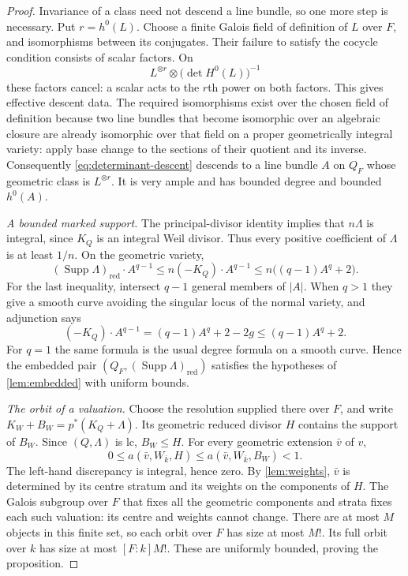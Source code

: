 \documentclass[11pt]{article}
\numberwithin{equation}{section}
\theoremstyle{definition}
\newcommand{\kb}{\overline{k}}
\newcommand{\Supp}{\operatorname{Supp}}
\newcommand{\red}{\mathrm{red}}
\begin{document}
\begin{proof}
Invariance of a class need not descend a line bundle, so one more step
is necessary. Put $r=h^0(L)$. Choose a finite Galois field of definition
of $L$ over $F$, and isomorphisms between its conjugates. Their failure
to satisfy the cocycle condition consists of scalar factors. On
\begin{equation}\label{eq:determinant-descent}
 L^{\otimes r}\otimes\bigl(\det H^0(L)\bigr)^{-1}
\end{equation}
these factors cancel: a scalar acts to the $r$th power on both factors.
This gives effective descent data. The required isomorphisms exist
over the chosen field of definition because two line bundles that
become isomorphic over an algebraic closure are already isomorphic
over that field on a proper geometrically integral variety: apply
base change to the sections of their quotient and its inverse.
Consequently \eqref{eq:determinant-descent} descends to a line bundle
$A$ on $Q_F$ whose geometric class is $L^{\otimes r}$. It is very ample
and has bounded degree and bounded $h^0(A)$.

\emph{A bounded marked support.}
The principal-divisor identity implies that $n\Lambda$ is integral,
since $K_Q$ is an integral Weil divisor. Thus every positive coefficient
of $\Lambda$ is at least $1/n$. On the geometric variety,
\begin{equation}\label{eq:marked-degree}
 (\Supp\Lambda)_{\red}\cdot A^{q-1}
 \leq n(-K_Q)\cdot A^{q-1}
 \leq n\bigl((q-1)A^q+2\bigr).
\end{equation}
For the last inequality, intersect $q-1$ general members of $|A|$.
When $q>1$ they give a smooth curve avoiding the singular locus of
the normal variety, and adjunction says
\[
 (-K_Q)\cdot A^{q-1}=(q-1)A^q+2-2g\leq(q-1)A^q+2.
\]
For $q=1$ the same formula is the usual degree formula on a smooth
curve. Hence the embedded pair $(Q_F,(\Supp\Lambda)_\red)$ satisfies
the hypotheses of \cref{lem:embedded} with uniform bounds.

\emph{The orbit of a valuation.}
Choose the resolution supplied there over $F$, and write
$K_W+B_W=p^*(K_Q+\Lambda)$. Its geometric reduced divisor $H$ contains
the support of $B_W$. Since $(Q,\Lambda)$ is lc, $B_W\leq H$.
For every geometric extension $\bar v$ of $v$,
\[
 0\leq a(\bar v,W_{\kb},H)
 \leq a(\bar v,W_{\kb},B_W)<1.
\]
The left-hand discrepancy is integral, hence zero. By
\cref{lem:weights}, $\bar v$ is determined by its centre stratum and
its weights on the components of $H$. The Galois subgroup over $F$
that fixes all the geometric components and strata fixes each such
valuation: its centre and weights cannot change. There are at most
$M$ objects in this finite set, so each orbit over $F$ has size at most
$M!$. Its full orbit over $k$ has size at most $[F:k]M!$. These are
uniformly bounded, proving the proposition.
\end{proof}
\end{document}
